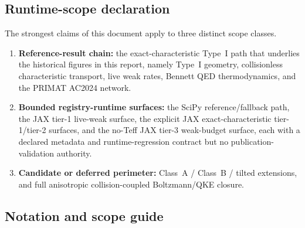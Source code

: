 \subsection{Runtime-scope declaration}

The strongest claims of this document apply to three distinct scope classes.
\begin{enumerate}
\item \textbf{Reference-result chain:} the exact-characteristic Type~I path that underlies the historical figures in this report, namely Type~I geometry, collisionless characteristic transport, live weak rates, Bennett QED thermodynamics, and the PRIMAT AC2024 network.
\item \textbf{Bounded registry-runtime surfaces:} the SciPy reference/fallback path, the JAX tier-1 live-weak surface, the explicit JAX exact-characteristic tier-1/tier-2 surfaces, and the no-Teff JAX tier-3 weak-budget surface, each with a declared metadata and runtime-regression contract but no publication-validation authority.
\item \textbf{Candidate or deferred perimeter:} Class~A / Class~B / tilted extensions, and full anisotropic collision-coupled Boltzmann/QKE closure.
\end{enumerate}

\subsection{Notation and scope guide}

